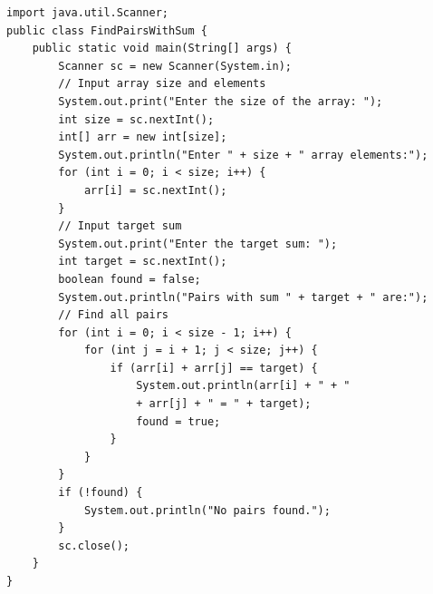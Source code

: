 \begin{verbatim}
import java.util.Scanner;
public class FindPairsWithSum {
    public static void main(String[] args) {
        Scanner sc = new Scanner(System.in);
        // Input array size and elements
        System.out.print("Enter the size of the array: ");
        int size = sc.nextInt();
        int[] arr = new int[size];
        System.out.println("Enter " + size + " array elements:");
        for (int i = 0; i < size; i++) {
            arr[i] = sc.nextInt();
        }
        // Input target sum
        System.out.print("Enter the target sum: ");
        int target = sc.nextInt();
        boolean found = false;
        System.out.println("Pairs with sum " + target + " are:");
        // Find all pairs
        for (int i = 0; i < size - 1; i++) {
            for (int j = i + 1; j < size; j++) {
                if (arr[i] + arr[j] == target) {
                    System.out.println(arr[i] + " + "
                    + arr[j] + " = " + target);
                    found = true;
                }
            }
        }
        if (!found) {
            System.out.println("No pairs found.");
        }
        sc.close();
    }
}

\end{verbatim}